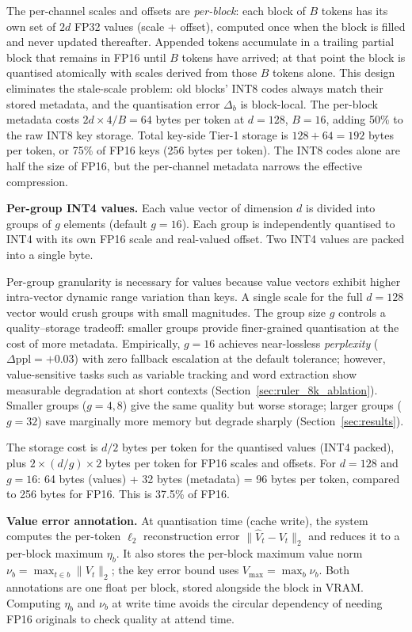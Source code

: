 \documentclass[10pt,twocolumn,a4paper]{article}
\theoremstyle{definition}
\theoremstyle{remark}
\newcommand{\norm}[1]{\lVert #1 \rVert}
\begin{document}
The per-channel scales and offsets are \emph{per-block}: each block of $B$ tokens has its own set of $2d$ FP32 values (scale + offset), computed once when the block is filled and never updated thereafter.  Appended tokens accumulate in a trailing partial block that remains in FP16 until $B$ tokens have arrived; at that point the block is quantised atomically with scales derived from those $B$ tokens alone.  This design eliminates the stale-scale problem: old blocks' INT8 codes always match their stored metadata, and the quantisation error $\Delta_b$ is block-local.  The per-block metadata costs $2d \times 4 / B = 64$ bytes per token at $d{=}128$, $B{=}16$, adding 50\% to the raw INT8 key storage.  Total key-side Tier-1 storage is $128 + 64 = 192$ bytes per token, or 75\% of FP16 keys (256 bytes per token).  The INT8 codes alone are half the size of FP16, but the per-channel metadata narrows the effective compression.

\textbf{Per-group INT4 values.}  Each value vector of dimension $d$ is divided into groups of $g$ elements (default $g = 16$).  Each group is independently quantised to INT4 with its own FP16 scale and real-valued offset.  Two INT4 values are packed into a single byte.

Per-group granularity is necessary for values because value vectors exhibit higher intra-vector dynamic range variation than keys.  A single scale for the full $d{=}128$ vector would crush groups with small magnitudes.  The group size $g$ controls a quality--storage tradeoff: smaller groups provide finer-grained quantisation at the cost of more metadata.  Empirically, $g{=}16$ achieves near-lossless \emph{perplexity} ($\Delta\text{ppl} = +0.03$) with zero fallback escalation at the default tolerance; however, value-sensitive tasks such as variable tracking and word extraction show measurable degradation at short contexts (Section~\ref{sec:ruler_8k_ablation}).  Smaller groups ($g{=}4, 8$) give the same quality but worse storage; larger groups ($g{=}32$) save marginally more memory but degrade sharply (Section~\ref{sec:results}).

The storage cost is $d/2$ bytes per token for the quantised values (INT4 packed), plus $2 \times (d/g) \times 2$ bytes per token for FP16 scales and offsets.  For $d{=}128$ and $g{=}16$: 64 bytes (values) + 32 bytes (metadata) = 96 bytes per token, compared to 256 bytes for FP16.  This is 37.5\% of FP16.

\textbf{Value error annotation.}  At quantisation time (cache write), the system computes the per-token $\ell_2$ reconstruction error $\norm{\hat{V}_t - V_t}_2$ and reduces it to a per-block maximum $\eta_b$.  It also stores the per-block maximum value norm $\nu_b = \max_{t \in b}\norm{V_t}_2$; the key error bound uses $V_{\max} = \max_b \nu_b$.  Both annotations are one float per block, stored alongside the block in VRAM\@.  Computing $\eta_b$ and $\nu_b$ at write time avoids the circular dependency of needing FP16 originals to check quality at attend time.
\end{document}
